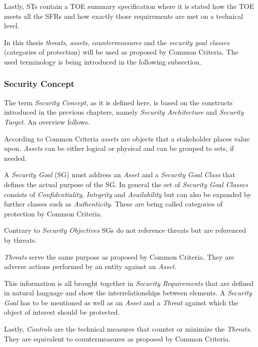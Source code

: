 Lastly, STs contain a TOE summary specification where it is stated how the TOE meets all the SFRs and how exactly those requirements are met on a technical level.

In this thesis \textit{threats}, \textit{assets}, \textit{countermeasures} and the \textit{security goal classes} (categories of protection) will be used as proposed by Common Criteria. The used terminology is being introduced in the following subsection. 

\subsubsection{Security Concept}
\label{subsubsec:secconc}

The term \textit{Security Concept}, as it is defined here, is based on the constructs introduced in the previous chapters, namely \textit{Security Architecture} and \textit{Security Target}. An overview follows. 

According to Common Criteria \textit{assets} are objects that a stakeholder places value upon. \textit{Assets} can be either logical or physical and can be grouped to sets, if needed.

A \textit{Security Goal} (SG) must address an \textit{Asset} and a \textit{Security Goal Class} that defines the actual purpose of the SG. In general the set of \textit{Security Goal Classes} consists of \textit{Confidentiality}, \textit{Integrity} and \textit{Availability} but can also be expanded by further classes such as \textit{Authenticity}. These are being called categories of protection by Common Criteria.

Contrary to \textit{Security Objectives} SGs do not reference threats but are referenced by threats.

\textit{Threats} serve the same purpose as proposed by Common Criteria. They are adverse actions performed by an entity against an \textit{Asset}. 

This information is all brought together in \textit{Security Requirements} that are defined in natural language and show the interrelationships between elements. A \textit{Security Goal} has to be mentioned as well as an \textit{Asset} and a \textit{Threat} against which the object of interest should be protected.

Lastly, \textit{Controls} are the technical measures that counter or minimize the \textit{Threats}. They are equivalent to countermeasures as proposed by Common Criteria.     

